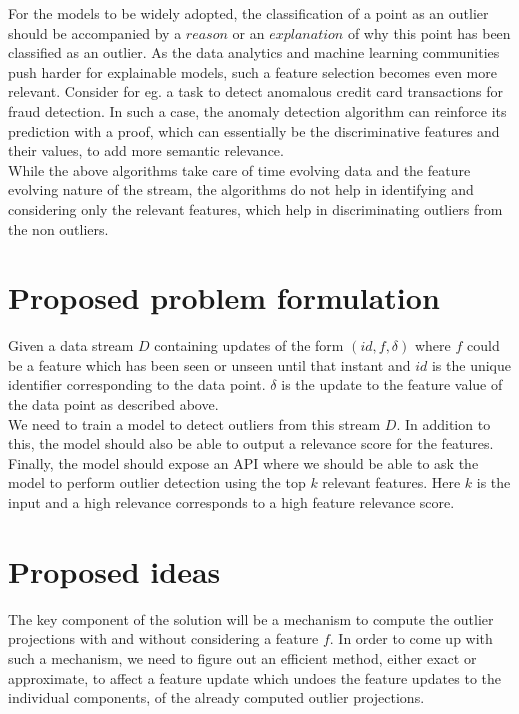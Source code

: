 For the models to be widely adopted, the classification of a point as an outlier should be accompanied by a $reason$ or an $explanation$ of why this point has been classified as an outlier. As the data analytics and machine learning communities push harder for explainable models, such a feature selection becomes even more relevant. Consider for eg. a task to detect anomalous credit card transactions for fraud detection. In such a case, the anomaly detection algorithm can reinforce its prediction with a proof, which can essentially be the discriminative features and their values, to add more semantic relevance. \\

While the above algorithms take care of time evolving data and the feature evolving nature of the stream, the algorithms do not help in identifying and considering only the relevant features, which help in discriminating outliers from the non outliers. 

\section{Proposed problem formulation}

Given a data stream $D$ containing updates of the form $(id, f, \delta)$ where $f$ could be a feature which has been seen or unseen until that instant and $id$ is the unique identifier corresponding to the data point. $\delta$ is the update to the feature value of the data point as described above. \\

We need to train a model to detect outliers from this stream $D$. In addition to this, the model should also be able to output a relevance score for the features. Finally, the model should expose an API where we should be able to ask the model to perform outlier detection using the top $k$ relevant features. Here $k$ is the input and a high relevance corresponds to a high feature relevance score.

\section{Proposed ideas}

The key component of the solution will be a mechanism to compute the outlier projections with and without considering a feature $f$. In order to come up with such a mechanism, we need to figure out an efficient method, either exact or approximate, to affect a feature update which undoes the feature updates to the individual components, of the already computed outlier projections. \\

